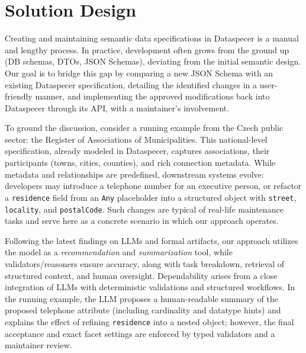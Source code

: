 \chapter{Solution Design}

Creating and maintaining semantic data specifications in Dataspecer is a manual and lengthy process. In practice, development often grows from the ground up (DB schemas, DTOs, JSON Schemas), deviating from the initial semantic design. Our goal is to bridge this gap by comparing a new JSON Schema with an existing Dataspecer specification, detailing the identified changes in a user-friendly manner, and implementing the approved modifications back into Dataspecer through its API, with a maintainer's involvement.

To ground the discussion, consider a running example from the Czech public sector: the Register of Associations of Municipalities. This national-level specification, already modeled in Dataspecer, captures associations, their participants (towns, cities, counties), and rich connection metadata. While metadata and relationships are predefined, downstream systems evolve: developers may introduce a telephone number for an executive person, or refactor a \texttt{residence} field from an \texttt{Any} placeholder into a structured object with \texttt{street}, \texttt{locality}, and \texttt{postalCode}. Such changes are typical of real-life maintenance tasks and serve here as a concrete scenario in which our approach operates.

Following the latest findings on LLMs and formal artifacts, our approach utilizes the model as a \emph{recommendation} and \emph{summarization} tool, while validators/reasoners ensure accuracy, along with task breakdown, retrieval of structured context, and human oversight. Dependability arises from a close integration of LLMs with deterministic validations and structured workflows. In the running example, the LLM proposes a human-readable summary of the proposed telephone attribute (including cardinality and datatype hints) and explains the effect of refining \texttt{residence} into a nested object; however, the final acceptance and exact facet settings are enforced by typed validators and a maintainer review.

